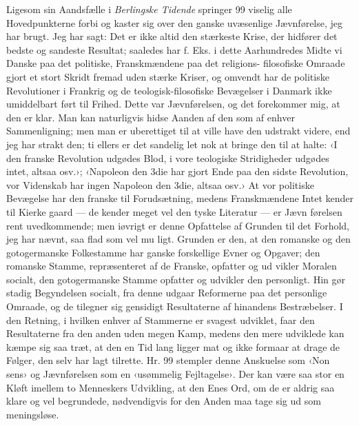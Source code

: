\documentclass[12pt,a4paper,openany]{book}
\newcommand{\opage}[1]{\marginnote{\footnotesize\textit{[#1]}}}
\begin{document}
Ligesom sin Aandsfælle i \emph{Berlingske Tidende} springer 99
viselig alle Hovedpunkterne forbi og kaster sig over den ganske
uvæsenlige Jævnførelse, jeg har brugt. Jeg har sagt: Det er ikke
altid den stærkeste Krise, der hidfører det bedste og sandeste
Resultat; saaledes har f. Eks. i dette Aarhundredes Midte vi
Danske paa det politiske, Franskmændene paa det religions-%
filosofiske Omraade gjort et stort Skridt fremad uden stærke
Kriser, og omvendt har de politiske Revolutioner i Frankrig og
de teologisk-filosofiske Bevægelser i Danmark ikke umiddelbart
ført til Frihed. Dette var Jævnførelsen, og det forekommer mig,
\opage{103}at den er klar. Man kan naturligvis hidse Aanden af den som
af enhver Sammenligning; men man er uberettiget til at ville
have den udstrakt videre, end jeg har strakt den; ti ellers er
det sandelig let nok at bringe den til at halte: ‹I den franske
Revolution udgødes Blod, i vore teologiske Stridigheder udgødes
intet, altsaa osv.›; ‹Napoleon den 3die har gjort Ende paa den
sidste Revolution, vor Videnskab har ingen Napoleon den 3die,
altsaa osv.› At vor politiske Bevægelse har den franske til
Forudsætning, medens Franskmændene Intet kender til Kierke\-%
gaard --- de kender meget vel den tyske Literatur --- er Jævn\-%
førelsen rent uvedkommende; men iøvrigt er denne Opfattelse af
Grunden til det Forhold, jeg har nævnt, saa flad som vel mu\-%
ligt. Grunden er den, at den romanske og den gotogermanske
Folkestamme har ganske forskellige Evner og Opgaver; den
romanske Stamme, repræsenteret af de Franske, opfatter og ud\-%
vikler Moralen socialt, den gotogermanske Stamme opfatter og
udvikler den personligt. Hin gør stadig Begyndelsen socialt, fra
denne udgaar Reformerne paa det personlige Omraade, og de
tilegner sig gensidigt Resultaterne af hinandens Bestræbelser. I
den Retning, i hvilken enhver af Stammerne er svagest udviklet,
faar den Resultaterne fra den anden uden megen Kamp, medens
den mere udviklede kan kæmpe sig saa træt, at den en Tid
lang ligger mat og ikke formaar at drage de Følger, den selv
har lagt tilrette. Hr. 99 stempler denne Anskuelse som ‹Non\-%
sens› og Jævnførelsen som en ‹usømmelig Fejltagelse›. Der kan
være saa stor en Kløft imellem to Menneskers Udvikling, at
den Enes Ord, om de er aldrig saa klare og vel begrundede,
nødvendigvis for den Anden maa tage sig ud som meningsløse.
\end{document}
